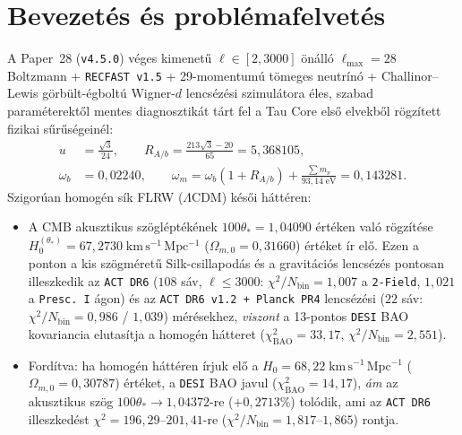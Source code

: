 \documentclass[11pt,a4paper]{article}
\begin{document}
\section{Bevezetés és problémafelvetés}
A Paper~28 (\texttt{v4.5.0}) véges kimenetű $\ell \in [2, 3000]$ önálló $\ell_{\max}=28$ Boltzmann + \texttt{RECFAST v1.5} + 29-momentumú tömeges neutrínó + Challinor--Lewis görbült-égboltú Wigner-$d$ lencsézési szimulátora éles, szabad paraméterektől mentes diagnosztikát tárt fel a Tau Core első elvekből rögzített fizikai sűrűségeinél:
\begin{equation}
\begin{aligned}
    u &= \frac{\sqrt{3}}{24}, \qquad R_{A/b} = \frac{213\sqrt{3}-20}{65} = 5{,}368105, \\
    \omega_b &= 0{,}02240, \qquad \omega_m = \omega_b(1 + R_{A/b}) + \frac{\sum m_\nu}{93{,}14\;\mathrm{eV}} = 0{,}143281.
\end{aligned}
\label{eq:locked-densities-hu}
\end{equation}
Szigorúan homogén sík FLRW ($\Lambda$CDM) késői háttéren:
\begin{itemize}\sloppy
    \item A CMB akusztikus szögléptékének $100\theta_* = 1{,}04090$ értéken való rögzítése $H_0^{(\theta_*)} = 67{,}2730\;\allowbreak\mathrm{km\,s^{-1}\,Mpc^{-1}}$ ($\Omega_{m,0} = 0{,}31660$) értéket ír elő. Ezen a ponton a kis szögméretű Silk-csillapodás és a gravitációs lencsézés pontosan illeszkedik az \texttt{ACT DR6} ($108$ sáv, $\ell \le 3000$: $\chi^2/N_{\mathrm{bin}} = 1{,}007$ a \texttt{2-Field}, $1{,}021$ a \texttt{Presc.~I} ágon) és az \texttt{ACT DR6 v1.2 + Planck PR4} lencsézési ($22$ sáv: $\chi^2/N_{\mathrm{bin}} = 0{,}986$ / $1{,}039$) mérésekhez, \emph{viszont} a 13-pontos \texttt{DESI} BAO kovariancia elutasítja a homogén hátteret ($\chi^2_{\mathrm{BAO}} = 33{,}17$, $\chi^2/N_{\mathrm{bin}} = 2{,}551$).
    \item Fordítva: ha homogén háttéren írjuk elő a $H_0 = 68{,}22\;\mathrm{km\,s^{-1}\,Mpc^{-1}}$ ($\Omega_{m,0} = 0{,}30787$) értéket, a \texttt{DESI} BAO javul ($\chi^2_{\mathrm{BAO}} = 14{,}17$), \emph{ám} az akusztikus szög $100\theta_* \to 1{,}04372$-re ($+0{,}2713\%$) tolódik, ami az \texttt{ACT DR6} illeszkedést $\chi^2 = 196{,}29\text{--}201{,}41$-re ($\chi^2/N_{\mathrm{bin}} = 1{,}817\text{--}1{,}865$) rontja.
\end{itemize}
\end{document}

